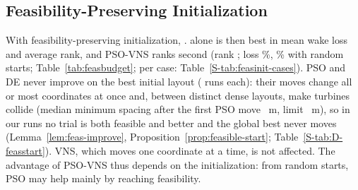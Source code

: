 \subsection{Feasibility-Preserving Initialization}
\label{sec:feasinit}
With feasibility-preserving initialization, \NFeasInitPhrase. \NFbFeasBestRank{} alone is then best in mean wake loss and average rank, and PSO-VNS ranks second (rank \NFbFeasRankPSOVNS; loss \NFbFeasLossPSOVNS\%, \NFbRandLossPSOVNS\% with random starts; Table~\ref{tab:feasbudget}; per case: Table~\ref{S-tab:feasinit-cases}). PSO and DE never improve on the best initial layout (\NDFsStoredRunsPSO{} runs each): their moves change all or most coordinates at once and, between distinct dense layouts, make turbines collide (median minimum spacing after the first PSO move \NDFsFirstMinSpPSO~m, limit \NDSmin~m), so in our runs no trial is both feasible and better and the global best never moves (Lemma~\ref{lem:feas-improve}, Proposition~\ref{prop:feasible-start}; Table~\ref{S-tab:D-feasstart}). VNS, which moves one coordinate at a time, is not affected. The advantage of PSO-VNS thus depends on the initialization: from random starts, PSO may help mainly by reaching feasibility.

